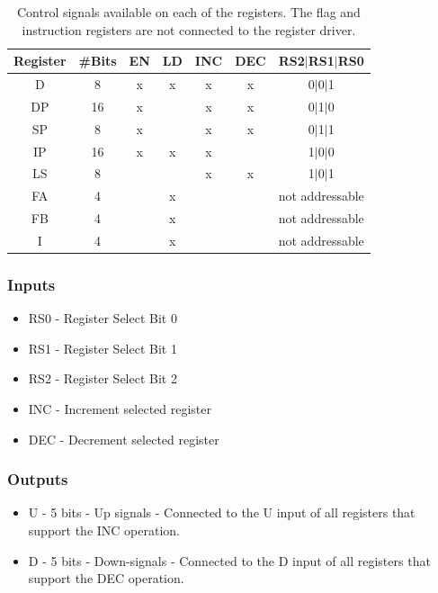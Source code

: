 \begin{table}[H]
  \centering
  \begin{tabular}{c|c|c|c|c|c|c}
    Register & \#Bits & EN  & LD  & INC  & DEC & RS2$|$RS1$|$RS0 \\ \hline 
    D        & 8      & x   & x   & x    & x   & 0$|$0$|$1 \\
    DP       & 16     & x   &     & x    & x   & 0$|$1$|$0 \\ 
    SP       & 8      & x   &     & x    & x   & 0$|$1$|$1 \\ 
    IP       & 16     & x   & x   & x    &     & 1$|$0$|$0 \\ 
    LS       & 8      &     &     & x    & x   & 1$|$0$|$1 \\ 
    FA       & 4      &     & x   &      &     & not addressable \\ 
    FB       & 4      &     & x   &      &     & not addressable  \\
    I        & 4      &     & x   &      &     & not addressable \\
  \end{tabular}
  \caption{Control signals available on each of the registers. The flag and instruction registers are not connected to the register driver.}
  \label{tab:registers}
\end{table}

\subsubsection*{Inputs}
\begin{itemize}
  \itemsep0em
\item RS0 - Register Select Bit 0
\item RS1 - Register Select Bit 1
\item RS2 - Register Select Bit 2
\item INC - Increment selected register
\item DEC - Decrement selected register
\end{itemize}

\subsubsection*{Outputs}
\begin{itemize}
\itemsep0em 
\item U - 5 bits - Up signals - Connected to the U input of all registers that support the INC operation.
\item D - 5 bits - Down-signals - Connected to the D input of all registers that support the DEC operation.
\end{itemize}


